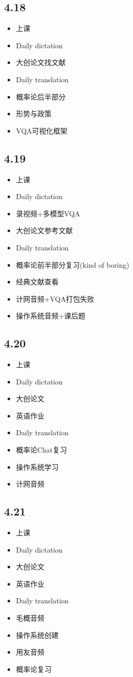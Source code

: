 \documentclass[UTF8]{ctexart}
\begin{document}
\subsection*{4.18}
\begin{itemize}
    \item 上课
    \item Daily dictation
    \item 大创论文找文献
    \item Daily translation
    \item 概率论后半部分
    \item 形势与政策
    \item VQA可视化框架
\end{itemize}
\subsection*{4.19}
\begin{itemize}
    \item 上课
    \item Daily dictation
    \item 录视频+多模型VQA
    \item 大创论文参考文献
    \item Daily translation
    \item 概率论前半部分复习(kind of boring)
    \item 经典文献查看
    \item 计网音频+VQA打包失败
    \item 操作系统音频+课后题
\end{itemize}
\subsection*{4.20}
\begin{itemize}
    \item 上课
    \item Daily dictation
    \item 大创论文
    \item 英语作业
    \item Daily translation
    \item 概率论Chat复习
    \item 操作系统学习
    \item 计网音频
\end{itemize}
\subsection*{4.21}
\begin{itemize}
    \item 上课
    \item Daily dictation
    \item 大创论文
    \item 英语作业
    \item Daily translation
    \item 毛概音频
    \item 操作系统创建
    \item 用友音频
    \item 概率论复习
\end{itemize}
\end{document}
